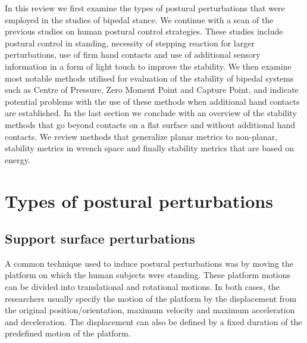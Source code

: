 \documentclass[12pt,a4paper,twoside]{article}
\begin{document}
In this review we first examine the types of postural perturbations that were employed in the studies of bipedal stance. We continue with a scan of the previous studies on human postural control strategies. These studies include postural control in standing, necessity of stepping reaction for larger perturbations, use of firm hand contacts and use of additional sensory information in a form of light touch to improve the stability. We then examine most notable methods utilised for evaluation of the stability of bipedal systems such as Centre of Pressure, Zero Moment Point and Capture Point, and indicate potential problems with the use of these methods when additional hand contacts are established. In the last section we conclude with an overview of the stability methods that go beyond contacts on a flat surface and without additional hand contacts. We review methods that generalize planar metrics to non-planar, stability metrics in wrench space and finally stability metrics that are based on energy.

\section{{Types of postural perturbations}}
\subsection{{Support surface perturbations}}
A common technique used to induce postural perturbations was by moving the platform on which the human subjects were standing. These platform motions can be divided into translational and rotational motions. In both cases, the researchers usually specify the motion of the platform by the displacement from the original position/orientation, maximum velocity and maximum acceleration and deceleration. The displacement can also be defined by a fixed duration of the predefined motion of the platform.
\end{document}

